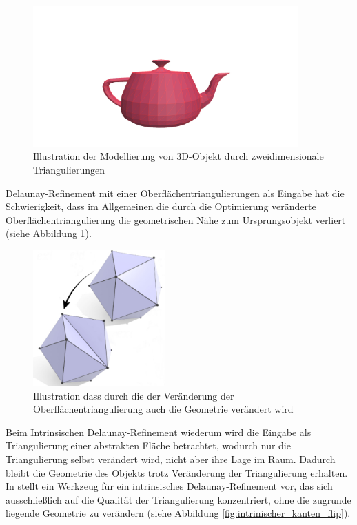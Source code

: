\begin{figure}[H]%
    \centering
    \includegraphics[width=4in]{images/image7.png}
  \caption{Illustration  der Modellierung von 3D-Objekt durch zweidimensionale Triangulierungen }
\end{figure}

Delaunay-Refinement  mit einer Oberflächentriangulierungen als Eingabe hat die Schwierigkeit, dass im Allgemeinen die durch die Optimierung veränderte  Oberflächentriangulierung die geometrischen Nähe zum Ursprungsobjekt verliert (siehe Abbildung \ref{fig:extrinsich_kanten_flip}).\\
\begin{figure}[H]%
    \centering
    \includegraphics[width=2in]{images/extrinsicher_kantenflip.jpg}
  \caption{Illustration  dass durch die der Veränderung der Oberflächentriangulierung auch die Geometrie verändert wird \cite{Sharp:2019:NIT}}
  \label{fig:extrinsich_kanten_flip}
\end{figure}

Beim Intrinsischen Delaunay-Refinement  wiederum wird die Eingabe als Triangulierung einer abstrakten Fläche betrachtet, wodurch nur die Triangulierung selbst verändert wird, nicht aber ihre Lage im Raum. Dadurch bleibt die Geometrie des Objekts trotz Veränderung der Triangulierung erhalten.
In \cite{Sharp:2019:NIT} stellt \citeauthor{Sharp:2019:NIT} ein Werkzeug für ein intrinsisches Delaunay-Refinement  vor, das sich ausschließlich auf die Qualität der Triangulierung konzentriert, ohne die zugrunde liegende Geometrie zu verändern (siehe Abbildung \ref{fig:intrinischer_kanten_flip}).\\  


